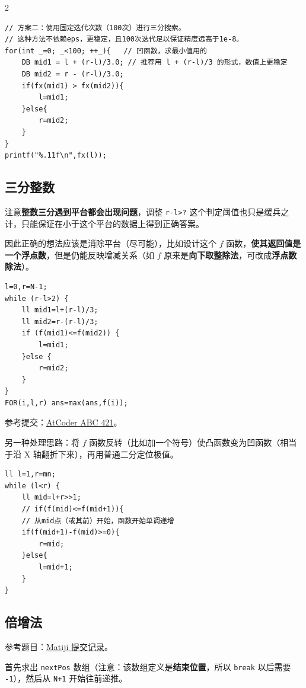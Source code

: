 \begin{multicols*}{2}
		\begin{verbatim}
// 方案二：使用固定迭代次数（100次）进行三分搜索。
// 这种方法不依赖eps，更稳定，且100次迭代足以保证精度远高于1e-8。
for(int _=0; _<100; ++_){   // 凹函数，求最小值用的
    DB mid1 = l + (r-l)/3.0; // 推荐用 l + (r-l)/3 的形式，数值上更稳定
    DB mid2 = r - (r-l)/3.0;
    if(fx(mid1) > fx(mid2)){
        l=mid1;
    }else{
        r=mid2;
    }
}
printf("%.11f\n",fx(l));
		\end{verbatim}

		\subsection{三分整数}

		注意\textbf{整数三分遇到平台都会出现问题}，调整 \texttt{r-l>?} 这个判定阈值也只是缓兵之计，只能保证在小于这个平台的数据上得到正确答案。

		因此正确的想法应该是消除平台（尽可能），比如设计这个 $f$ 函数，\textbf{使其返回值是一个浮点数}，但是仍能反映增减关系（如 $f$ 原来是\textbf{向下取整除法}，可改成\textbf{浮点数除法}）。

		\begin{verbatim}
l=0,r=N-1;
while (r-l>2) {
    ll mid1=l+(r-l)/3;
    ll mid2=r-(r-l)/3;
    if (f(mid1)<=f(mid2)) {
        l=mid1;
    }else {
        r=mid2;
    }
}
FOR(i,l,r) ans=max(ans,f(i));
		\end{verbatim}

		参考提交：\href{https://atcoder.jp/contests/abc421/submissions/68978595}{AtCoder ABC 421}。

		另一种处理思路：将 $f$ 函数反转（比如加一个符号）使凸函数变为凹函数（相当于沿 X 轴翻折下来），再用普通二分定位极值。

		\begin{verbatim}
ll l=1,r=mn;
while (l<r) {
    ll mid=l+r>>1;
    // if(f(mid)<=f(mid+1)){
    // 从mid点（或其前）开始，函数开始单调递增
    if(f(mid+1)-f(mid)>=0){
        r=mid;
    }else{
        l=mid+1;
    }
}
		\end{verbatim}

		\subsection{倍增法}

		参考题目：\href{https://www.matiji.net/exam/oj/submit-detail/13507760/29/4498/F16DA07A4D99E21DFFEF46BD18FF68AD}{Matiji 提交记录}。

		首先求出 \texttt{nextPos} 数组（注意：该数组定义是\textbf{结束位置}，所以 \texttt{break} 以后需要 \texttt{-1}），然后从 \texttt{N+1} 开始往前递推。


\end{multicols*}

